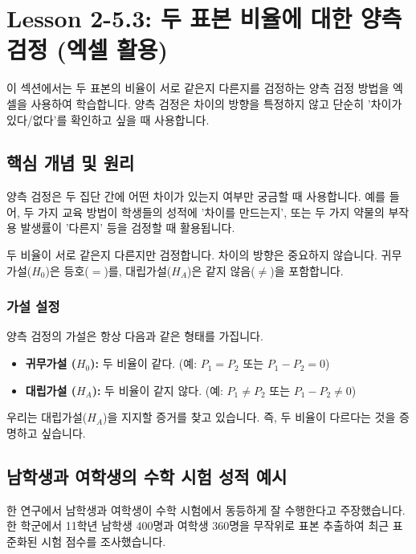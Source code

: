 \documentclass[11pt,a4paper]{book}
\theoremstyle{definition}
\begin{document}
\section{Lesson 2-5.3: 두 표본 비율에 대한 양측 검정 (엑셀 활용)}

이 섹션에서는 두 표본의 비율이 서로 같은지 다른지를 검정하는 양측 검정 방법을 엑셀을 사용하여 학습합니다. 양측 검정은 차이의 방향을 특정하지 않고 단순히 '차이가 있다/없다'를 확인하고 싶을 때 사용합니다.

\subsection{핵심 개념 및 원리}

양측 검정은 두 집단 간에 어떤 차이가 있는지 여부만 궁금할 때 사용합니다. 예를 들어, 두 가지 교육 방법이 학생들의 성적에 '차이를 만드는지', 또는 두 가지 약물의 부작용 발생률이 '다른지' 등을 검정할 때 활용됩니다.

\begin{summarybox}[title=양측 검정의 핵심:]
두 비율이 서로 같은지 다른지만 검정합니다. 차이의 방향은 중요하지 않습니다.
귀무가설($H_0$)은 등호($=$)를, 대립가설($H_A$)은 같지 않음($\neq$)을 포함합니다.
\end{summarybox}

\subsubsection{가설 설정}
양측 검정의 가설은 항상 다음과 같은 형태를 가집니다.

\begin{itemize}
    \item \textbf{귀무가설 ($H_0$):} 두 비율이 같다. (예: $P_1 = P_2$ 또는 $P_1 - P_2 = 0$)
    \item \textbf{대립가설 ($H_A$):} 두 비율이 같지 않다. (예: $P_1 \neq P_2$ 또는 $P_1 - P_2 \neq 0$)
\end{itemize}
우리는 대립가설($H_A$)을 지지할 증거를 찾고 있습니다. 즉, 두 비율이 다르다는 것을 증명하고 싶습니다.

\subsection{남학생과 여학생의 수학 시험 성적 예시}

한 연구에서 남학생과 여학생이 수학 시험에서 동등하게 잘 수행한다고 주장했습니다. 한 학군에서 11학년 남학생 400명과 여학생 360명을 무작위로 표본 추출하여 최근 표준화된 시험 점수를 조사했습니다.
\end{document}
